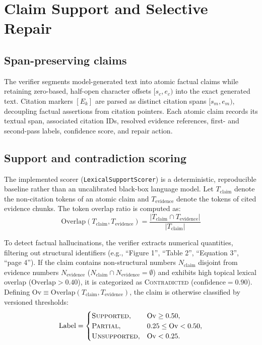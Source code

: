 \section{Claim Support and Selective Repair}
\subsection{Span-preserving claims}
The verifier segments model-generated text into atomic factual claims while retaining zero-based, half-open character offsets $[s_c, e_c)$ into the exact generated text. Citation markers $[E_k]$ are parsed as distinct citation spans $[s_m, e_m)$, decoupling factual assertions from citation pointers. Each atomic claim records its textual span, associated citation IDs, resolved evidence references, first- and second-pass labels, confidence score, and repair action.

\subsection{Support and contradiction scoring}
The implemented scorer (\texttt{LexicalSupportScorer}) is a deterministic, reproducible baseline rather than an uncalibrated black-box language model. Let $T_{\text{claim}}$ denote the non-citation tokens of an atomic claim and $T_{\text{evidence}}$ denote the tokens of cited evidence chunks. The token overlap ratio is computed as:
\begin{equation}
\text{Overlap}(T_{\text{claim}}, T_{\text{evidence}}) = \frac{|T_{\text{claim}} \cap T_{\text{evidence}}|}{|T_{\text{claim}}|}
\end{equation}

To detect factual hallucinations, the verifier extracts numerical quantities, filtering out structural identifiers (e.g., ``Figure 1'', ``Table 2'', ``Equation 3'', ``page 4''). If the claim contains non-structural numbers $N_{\text{claim}}$ disjoint from evidence numbers $N_{\text{evidence}}$ ($N_{\text{claim}} \cap N_{\text{evidence}} = \emptyset$) and exhibits high topical lexical overlap ($\text{Overlap} > 0.40$), it is categorized as \textsc{Contradicted} ($\text{confidence} = 0.90$). Defining $\text{Ov} \equiv \text{Overlap}(T_{\text{claim}}, T_{\text{evidence}})$, the claim is otherwise classified by versioned thresholds:
\begin{equation}
\text{Label} = \begin{cases}
\textsc{Supported}, & \text{Ov} \ge 0.50, \\
\textsc{Partial}, & 0.25 \le \text{Ov} < 0.50, \\
\textsc{Unsupported}, & \text{Ov} < 0.25.
\end{cases}
\end{equation}

